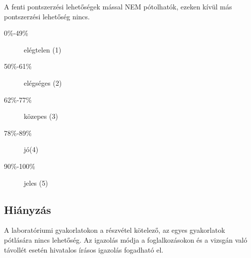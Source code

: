 A fenti pontszerzési lehetőségek mással NEM pótolhatók, ezeken kívül más pontszerzési lehetőség nincs.
 
 

\bigskip

\begin{minipage}{0.5\textwidth}
\begin{description}
\item[0\%-49\%] 	elégtelen (1)
\item[50\%-61\%] 	elégséges (2)
\item[62\%-77\%] 	közepes (3)
\item[78\%-89\%] 	jó(4)
\item[90\%-100\%] 	jeles (5)
\end{description}
\end{minipage}

\subsection*{Hiányzás}
A laboratóriumi gyakorlatokon a részvétel kötelező, az egyes gyakorlatok pótlására nincs lehetőség.
%
 Az igazolás módja a foglalkozásokon és a vizsgán való távollét esetén {\color{red}{kizárólag}} hivatalos írásos igazolás fogadható el.



